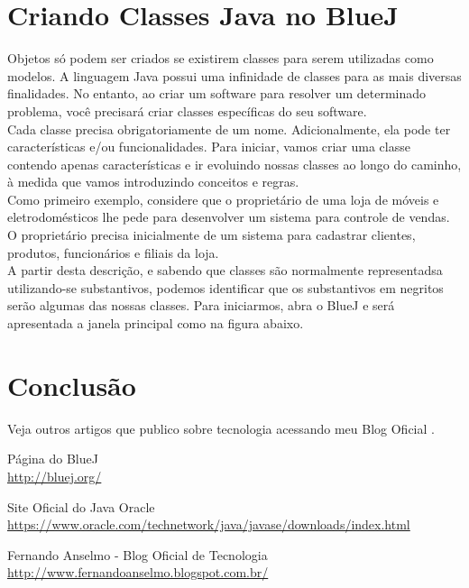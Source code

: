 \documentclass[a4paper,11pt]{article}
\begin{document}
\section{Criando Classes Java no BlueJ}
Objetos só podem ser criados se existirem classes para serem utilizadas como modelos. A linguagem Java possui uma infinidade de classes para as mais diversas finalidades. No entanto, ao criar um software para resolver um determinado problema, você precisará criar classes específicas do seu software. \\[2mm]
Cada classe precisa obrigatoriamente de um nome. Adicionalmente, ela pode ter características e/ou funcionalidades. Para iniciar, vamos criar uma classe contendo apenas características e ir evoluindo nossas classes ao longo do caminho, à medida que vamos introduzindo conceitos e regras. \\[2mm]
Como primeiro exemplo, considere que o proprietário de uma loja de móveis e eletrodomésticos lhe pede para desenvolver um sistema para controle de vendas. O proprietário precisa inicialmente de um sistema para cadastrar clientes, produtos, funcionários e filiais da loja. \\[2mm]
A partir desta descrição, e sabendo que classes são normalmente representadsa utilizando-se substantivos, podemos identificar que os substantivos em negritos serão algumas das nossas classes. Para iniciarmos, abra o BlueJ e será apresentada a janela principal como na figura abaixo.

\section{Conclusão}
Veja outros artigos que publico sobre tecnologia acessando meu Blog Oficial \cite{fernandoanselmo}.


\begin{thebibliography}{2}

  Página do BlueJ \\
  \url{http://bluej.org/}

  Site Oficial do Java Oracle \\
  \url{https://www.oracle.com/technetwork/java/javase/downloads/index.html}

  Fernando Anselmo - Blog Oficial de Tecnologia \\
  \url{http://www.fernandoanselmo.blogspot.com.br/}

\end{thebibliography}
  
\end{document}
